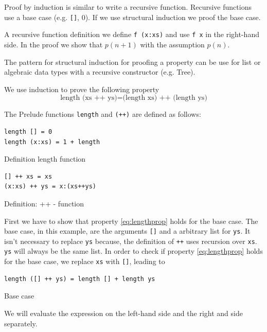 \documentclass[twoside, a4paper]{article}
\begin{document}
Proof by induction is similar to write a recursive function. Recursive functions use a base case (e.g. \verb|[]|, 0). 
If we use structural induction we proof the base case.

A recursive function definition we define \verb|f (x:xs)| and use \verb|f x| in the right-hand side. In the proof we show that $p(n+1)$ with the assumption $p(n)$.

The pattern for structural induction for proofing a property can be use for list or algebraic data types with a recursive constructor (e.g. Tree).

We use induction to prove the following property
\begin{equation}
  \label{eq:lengthprop}
  \text{length (xs ++ ys)} = \text{(length xs) ++ (length ys)}
\end{equation}

The Prelude functions \verb|length| and \verb|(++)| are defined as follows:
\begin{program}
\begin{verbatim}
length [] = 0
length (x:xs) = 1 + length 
\end{verbatim}
\caption{Definition length function}
\label{lst:lengthdefinition}  
\end{program}

\begin{program}
\begin{verbatim}
[] ++ xs = xs
(x:xs) ++ ys = x:(xs++ys)
\end{verbatim}
\caption{Definition: ++ - function}
\label{lst:catdefinition}  
\end{program}

First we have to show that property \ref{eq:lengthprop} holds for the base case. The base case, in this example, are the arguments \verb|[]| and a arbitrary list for \verb|ys|. It isn't necessary to replace \verb|ys| because, the definition of \verb|++| uses recursion over \verb|xs|. \verb|ys| will always be the same list.
In order to check if property \ref{eq:lengthprop} holds for the base case, we replace \verb|xs| with  \verb|[]|, leading to

\begin{program}
\begin{verbatim}
length ([] ++ ys) = length [] + length ys
\end{verbatim}
\caption{Base case}
\label{lst:equality1}
\end{program}

We will evaluate the expression on the left-hand side and the right and side separately.
\end{document}
